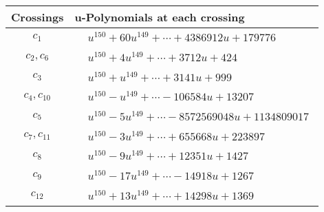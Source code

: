 \documentclass[1p]{elsarticle_modified}
\theoremstyle{definition}
\begin{document}
\begin{tabular}{m{50pt}|m{274pt}}
Crossings & \hspace{64pt}u-Polynomials at each crossing \\
\hline $$\begin{aligned}c_{1}\end{aligned}$$&$\begin{aligned}
&u^{150}+60 u^{149}+\cdots+4386912 u+179776
\end{aligned}$\\
\hline $$\begin{aligned}c_{2},c_{6}\end{aligned}$$&$\begin{aligned}
&u^{150}+4 u^{149}+\cdots+3712 u+424
\end{aligned}$\\
\hline $$\begin{aligned}c_{3}\end{aligned}$$&$\begin{aligned}
&u^{150}+u^{149}+\cdots+3141 u+999
\end{aligned}$\\
\hline $$\begin{aligned}c_{4},c_{10}\end{aligned}$$&$\begin{aligned}
&u^{150}- u^{149}+\cdots-106584 u+13207
\end{aligned}$\\
\hline $$\begin{aligned}c_{5}\end{aligned}$$&$\begin{aligned}
&u^{150}-5 u^{149}+\cdots-8572569048 u+1134809017
\end{aligned}$\\
\hline $$\begin{aligned}c_{7},c_{11}\end{aligned}$$&$\begin{aligned}
&u^{150}-3 u^{149}+\cdots+655668 u+223897
\end{aligned}$\\
\hline $$\begin{aligned}c_{8}\end{aligned}$$&$\begin{aligned}
&u^{150}-9 u^{149}+\cdots+12351 u+1427
\end{aligned}$\\
\hline $$\begin{aligned}c_{9}\end{aligned}$$&$\begin{aligned}
&u^{150}-17 u^{149}+\cdots-14918 u+1267
\end{aligned}$\\
\hline $$\begin{aligned}c_{12}\end{aligned}$$&$\begin{aligned}
&u^{150}+13 u^{149}+\cdots+14298 u+1369
\end{aligned}$\\
\hline
\end{tabular}\\~\\
\end{document}
